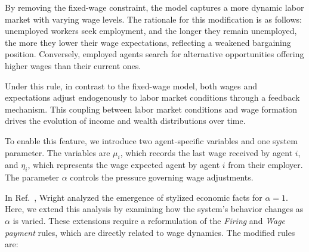 \documentclass[12pt,preprint]{revtex4-1}
\begin{document}
{\color{red}  
By removing the fixed-wage constraint, the model captures a more dynamic labor market with varying wage levels. The rationale for this modification is as follows: unemployed workers seek employment, and the longer they remain unemployed, the more they  lower their wage expectations, reflecting a weakened bargaining position. Conversely, employed agents search for alternative opportunities offering higher wages than their current ones.

Under this rule, in contrast to the fixed-wage model, both wages and expectations adjust endogenously to labor market conditions through a feedback mechanism. 
This coupling between labor market conditions and wage formation drives the evolution of income and wealth distributions over time.
}


To enable this feature, we introduce two agent-specific variables and one system parameter. The variables are $\mu_i$, which records the last wage received by agent $i$, and $\eta_i$, which represents the wage expected agent by agent $i$ from their employer. The parameter $\alpha$ controls the pressure governing wage adjustments.

In Ref.~\cite{WRIGHT2010}, Wright analyzed the emergence of stylized economic facts for $\alpha = 1$. Here, we extend this analysis by examining how the system’s behavior changes as $\alpha$ is varied.
These extensions require a reformulation of the {\it Firing} and {\it Wage payment} rules, which are directly related to wage dynamics. The modified rules are:
\end{document}
